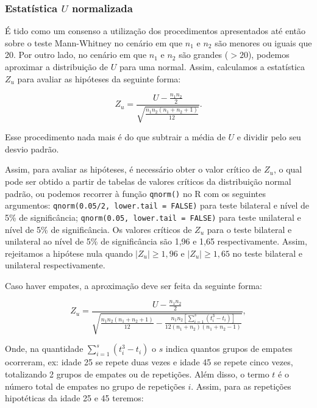 \documentclass[
  letterpaper,
  DIV=11,
  numbers=noendperiod]{scrreprt}
\begin{document}
\hypertarget{estatuxedstica-u-normalizada}{%
\subsubsection{\texorpdfstring{Estatística \(U\)
normalizada}{Estatística U normalizada}}\label{estatuxedstica-u-normalizada}}

É tido como um consenso a utilização dos procedimentos apresentados até
então sobre o teste Mann-Whitney no cenário em que \(n_1\) e \(n_2\) são
menores ou iguais que 20. Por outro lado, no cenário em que \(n_1\) e
\(n_2\) são grandes (\(>20\)), podemos aproximar a distribuição de \(U\)
para uma normal. Assim, calculamos a estatística \(Z_u\) para avaliar as
hipóteses da seguinte forma:

\[Z_u = \displaystyle \frac{U-\displaystyle\frac{n_1  n_2}{2}}{\sqrt{\displaystyle\frac{n_1 n_2\left(n_1+n_2+1\right)}{12}}}.\]

Esse procedimento nada mais é do que subtrair a média de \(U\) e dividir
pelo seu desvio padrão.

Assim, para avaliar as hipóteses, é necessário obter o valor crítico de
\(Z_u\), o qual pode ser obtido a partir de tabelas de valores críticos
da distribuição normal padrão, ou podemos recorrer à função
\texttt{qnorm()} no R com os seguintes argumentos:
\texttt{qnorm(0.05/2,\ lower.tail\ =\ FALSE)} para teste bilateral e
nível de 5\% de significância;
\texttt{qnorm(0.05,\ lower.tail\ =\ FALSE)} para teste unilateral e
nível de 5\% de significância. Os valores críticos de \(Z_u\) para o
teste bilateral e unilateral ao nível de 5\% de significância são 1,96 e
1,65 respectivamente. Assim, rejeitamos a hipótese nula quando
\(|Z_u|\geq1,96\) e \(|Z_u|\geq1,65\) no teste bilateral e unilateral
respectivamente.

Caso haver empates, a aproximação deve ser feita da seguinte forma:

\[Z_u = \displaystyle \frac{U-\displaystyle\frac{n_1  n_2}{2}}{\sqrt{\displaystyle\frac{n_1n_2\left(n_1+n_2+1\right)}{12}- \displaystyle\frac{n_1n_2\left[\sum_{i=1}^s\left(t_i^3-t_i\right)\right]}{12  \left(n_1+n_2\right) \left(n_1+n_2-1\right)}}},\]

Onde, na quantidade \(\sum_{i=1}^s\left(t_i^3-t_i\right)\) o \(s\)
indica quantos grupos de empates ocorreram, ex: idade 25 se repete duas
vezes e idade 45 se repete cinco vezes, totalizando 2 grupos de empates
ou de repetições. Além disso, o termo \(t\) é o número total de empates
no grupo de repetições \(i\). Assim, para as repetições hipotéticas da
idade 25 e 45 teremos:
\end{document}
